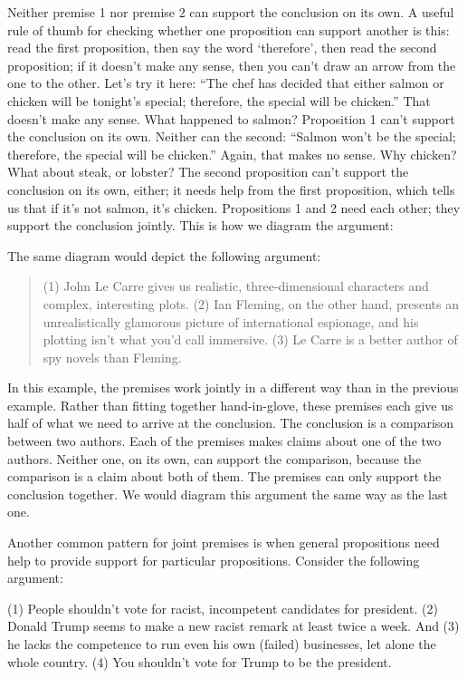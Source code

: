 Neither premise 1 nor premise 2 can support the conclusion on its own. A useful rule of thumb for
checking whether one proposition can support another is this: read the first proposition, then say
the word `therefore', then read the second proposition; if it doesn't make any sense, then you can't
draw an arrow from the one to the other. Let's try it here: ``The chef has decided that either salmon
or chicken will be tonight's special; therefore, the special will be chicken.'' That doesn't make any
sense. What happened to salmon? Proposition 1 can't support the conclusion on its own. Neither
can the second: ``Salmon won't be the special; therefore, the special will be chicken.'' Again, that
makes no sense. Why chicken? What about steak, or lobster? The second proposition can't support
the conclusion on its own, either; it needs help from the first proposition, which tells us that if it's
not salmon, it's chicken. Propositions 1 and 2 need each other; they support the conclusion jointly.
This is how we diagram the argument:



The same diagram would depict the following argument:

\begin{quotation}
(1) John Le Carre gives us realistic, three-dimensional characters and complex, interesting
plots. (2) Ian Fleming, on the other hand, presents an unrealistically glamorous picture of
international espionage, and his plotting isn't what you'd call immersive. (3) Le Carre is a
better author of spy novels than Fleming.
\end{quotation}

In this example, the premises work jointly in a different way than in the previous example. Rather
than fitting together hand-in-glove, these premises each give us half of what we need to arrive at
the conclusion. The conclusion is a comparison between two authors. Each of the premises makes
claims about one of the two authors. Neither one, on its own, can support the comparison, because
the comparison is a claim about both of them. The premises can only support the conclusion
together. We would diagram this argument the same way as the last one.

Another common pattern for joint premises is when general propositions need help to provide
support for particular propositions. Consider the following argument:

(1) People shouldn't vote for racist, incompetent candidates for president. (2) Donald Trump
seems to make a new racist remark at least twice a week. And (3) he lacks the competence
to run even his own (failed) businesses, let alone the whole country. (4) You shouldn't vote
for Trump to be the president.

